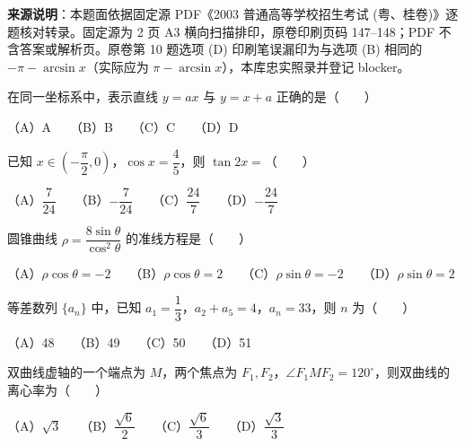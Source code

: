 

\begin{gktip}
\textbf{来源说明}：本题面依据固定源 PDF《2003 普通高等学校招生考试 (粤、桂卷)》逐题核对转录。固定源为 2 页 A3 横向扫描排印，原卷印刷页码 147–148；PDF 不含答案或解析页。原卷第 10 题选项 (D) 印刷笔误漏印为与选项 (B) 相同的 $-\pi - \arcsin x$（实际应为 $\pi - \arcsin x$），本库忠实照录并登记 blocker。
\end{gktip}

\Needspace{0.4\textheight}
\begin{question}
在同一坐标系中，表示直线 $y = ax$ 与 $y = x + a$ 正确的是\mbox{（　　）}
\nopagebreak[4]
\begin{center}\end{center}
\nopagebreak[4]
（A）A　　（B）B　　（C）C　　（D）D

\end{question}
\begin{question}
已知 $x \in \left(-\dfrac{\pi}{2}, 0\right)$，$\cos x = \dfrac{4}{5}$，则 $\tan 2x =$\mbox{（　　）}

（A）$\dfrac{7}{24}$　　（B）$-\dfrac{7}{24}$　　（C）$\dfrac{24}{7}$　　（D）$-\dfrac{24}{7}$

\end{question}
\begin{question}
圆锥曲线 $\rho = \dfrac{8\sin\theta}{\cos^2\theta}$ 的准线方程是\mbox{（　　）}

（A）$\rho\cos\theta = -2$　　（B）$\rho\cos\theta = 2$　　（C）$\rho\sin\theta = -2$　　（D）$\rho\sin\theta = 2$

\end{question}
\begin{question}
等差数列 $\{a_n\}$ 中，已知 $a_1 = \dfrac{1}{3}$，$a_2 + a_5 = 4$，$a_n = 33$，则 $n$ 为\mbox{（　　）}

（A）48　　（B）49　　（C）50　　（D）51

\end{question}
\begin{question}
双曲线虚轴的一个端点为 $M$，两个焦点为 $F_1, F_2$，$\angle F_1 M F_2 = 120^\circ$，则双曲线的离心率为\mbox{（　　）}

（A）$\sqrt{3}$　　（B）$\dfrac{\sqrt{6}}{2}$　　（C）$\dfrac{\sqrt{6}}{3}$　　（D）$\dfrac{\sqrt{3}}{3}$

\end{question}
